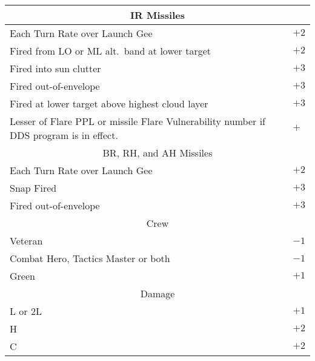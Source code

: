 \begin{onecolumntable}


\begin{tabularx}{\linewidth}{Xl}
\toprule
\multicolumn{2}{c}{IR Missiles}\\
\midrule
Each Turn Rate over Launch Gee&$+2$\\
Fired from LO or ML alt.\ band at lower target&$+2$\\
Fired into sun clutter&$+3$\\
Fired out-of-envelope&$+3$\\
Fired at lower target above highest cloud layer&$+3$\\
Lesser of Flare PPL or missile Flare Vulnerability number if DDS program is in effect.&$+$\\
\midrule
\multicolumn{2}{c}{BR, RH, and AH Missiles}\\
\midrule
Each Turn Rate over Launch Gee&$+2$\\
Snap Fired&$+3$\\
Fired out-of-envelope&$+3$\\
\midrule
\multicolumn{2}{c}{Crew}\\
\midrule
Veteran&$-1$\\
Combat Hero, 
Tactics Master or both&$-1$\\
Green&$+1$\\
\midrule
\multicolumn{2}{c}{Damage}\\
\midrule
L or 2L&$+1$\\
H&$+2$\\
C&$+2$\\
\bottomrule
\end{tabularx}

\end{onecolumntable}